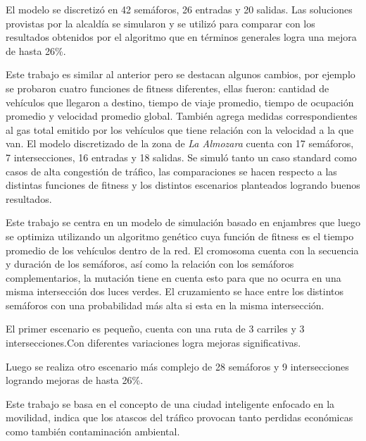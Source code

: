 \begin{itemize}
\begin{item}
		El modelo se discretizó en 42 semáforos, 26 entradas y 20 salidas.
		Las soluciones provistas por la alcaldía se simularon y se utilizó para comparar con los resultados obtenidos por el algoritmo que en términos generales logra una mejora de hasta 26\%.
		
	\end{item}
	
	\begin{item}
		Este trabajo es similar al anterior pero se destacan algunos cambios, por ejemplo se probaron cuatro funciones de fitness diferentes, ellas fueron: cantidad de vehículos que llegaron a destino, tiempo de viaje promedio, tiempo de ocupación promedio y velocidad promedio global.
		También agrega medidas correspondientes al gas total emitido por los vehículos que tiene relación con la velocidad a la que van.
		El modelo discretizado de la zona de \emph{La Almozara} cuenta con 17 semáforos, 7 intersecciones, 16 entradas y 18 salidas.
		Se simuló tanto un caso standard como casos de alta congestión de tráfico, las comparaciones se hacen respecto a las distintas funciones de fitness y los distintos escenarios planteados logrando buenos resultados.
		
	\end{item}
	
	
	\begin{item}
		\bibentry{Penner2002}
		Este trabajo se centra en un modelo de simulación basado en enjambres que luego se optimiza utilizando un algoritmo genético cuya función de fitness es el tiempo promedio de los vehículos dentro de la red. El cromosoma cuenta con la secuencia y duración de los semáforos, así como la relación con los semáforos complementarios, la mutación tiene en cuenta esto para que no ocurra en una misma intersección dos luces verdes. El cruzamiento se hace entre los distintos semáforos con una probabilidad más alta si esta en la misma intersección.
		
		El primer escenario es pequeño, cuenta con una ruta de 3 carriles y 3 intersecciones.Con diferentes variaciones logra mejoras significativas.
		
		Luego se realiza otro escenario más complejo de 28 semáforos y 9 intersecciones logrando mejoras de hasta 26\%.
	\end{item}	
	
	
	\begin{item}
		\bibentry{Stolfi2012}
		Este trabajo se basa en el concepto de una ciudad inteligente enfocado en la movilidad, indica que los atascos del tráfico provocan tanto perdidas económicas como también contaminación ambiental.
		

\end{item}
\end{itemize}
